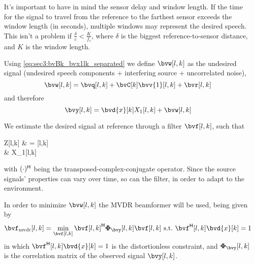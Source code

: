 It's important to have in mind the sensor delay and window length. If the time for the signal to travel from the reference to the farthest sensor exceeds the window length (in seconds), multiple windows may represent the desired speech. This isn't a problem if $\frac{\delta}{c} < \frac{K}{f_s}$, where $\delta$ is the biggest reference-to-sensor distance, and $K$ is the window length.

Using \cref{eq:sec3:bvBk_bvx1lk_separated} we define $\bvw[l,k]$ as the undesired signal (undesired speech components + interfering source + uncorrelated noise),
\begin{equation}
	\label{eq:sec3:def_undes_sig_bvwlk}
	\bvw[l,k] = \bvq[l,k] + \bvC[k] \bvv{1}[l,k] + \bvr[l,k]
\end{equation}
and therefore
\begin{equation}
	\label{eq:sec3:time-freq_model_final}
	\bvy[l,k] = \bvd{x}[k] X_1[l,k] + \bvw[l,k]
\end{equation}


We estimate the desired signal at reference through a filter $\bvf[l,k]$, such that
\begin{equations}
	Z[l,k]
	& = \he{\bvf}[l,k] \bvy[l,k] \\
	& \approx X_1[l,k]
\end{equations}
with $(\cdot)^{\mathsf{H}}$ being the transposed-complex-conjugate operator. Since the source signals' properties can vary over time, so can the filter, in order to adapt to the environment.

In order to minimize $\bvw[l,k]$ the MVDR beamformer \cite{erdogan_improved_2016} will be used, being given by
\begin{equation}
	\label{eq:sec3:minimization_problem_mvdr}
	\bvf_{\mvdr}[l,k] = \min_{\bvf[l,k]} \he{\bvf[l,k]} \Corr{\bvy}[l,k] \bvf[l,k]~\text{s.t.}~\he{\bvf}[l,k] \bvd{x}[k] = 1
\end{equation}
in which $\he{\bvf}[l,k] \bvd{x}[k] = 1$ is the distortionless constraint, and $\Corr{\bvy}[l,k]$ is the correlation matrix of the observed signal $\bvy[l,k]$. %


